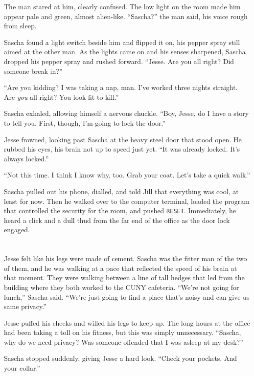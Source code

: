 \documentclass[12pt]{book}
\begin{document}
The man stared at him, clearly confused.  The low light on the room made him appear pale and green, almost alien-like.  ``Sascha?'' the man said, his voice rough from sleep.

Sascha found a light switch beside him and flipped it on, his pepper spray still aimed at the other man.  As the lights came on and his senses sharpened, Sascha dropped his pepper spray and rushed forward.  ``Jesse.  Are you all right?  Did someone break in?''

``Are you kidding?  I was taking a nap, man.  I've worked three nights straight.  Are \emph{you} all right?  You look fit to kill.''

Sascha exhaled, allowing himself a nervous chuckle.  ``Boy, Jesse, do I have a story to tell you.  First, though, I'm going to lock the door.''

Jesse frowned, looking past Sascha at the heavy steel door that stood open.  He rubbed his eyes, his brain not up to speed just yet.  ``It was already locked.  It's always locked.''

``Not this time.  I think I know why, too.  Grab your coat.  Let's take a quick walk.''

Sascha pulled out his phone, dialled, and told Jill that everything was cool, at least for now.  Then he walked over to the computer terminal, loaded the program that controlled the security for the room, and pushed \texttt{RESET}.  Immediately, he heard a click and a dull thud from the far end of the office as the door lock engaged.

\chapter{}

Jesse felt like his legs were made of cement.  Sascha was the fitter man of the two of them, and he was walking at a pace that reflected the speed of his brain at that moment.  They were walking between a line of tall hedges that led from the building where they both worked to the CUNY cafeteria.  ``We're not going for lunch,'' Sascha said.  ``We're just going to find a place that's noisy and can give us same privacy.''

Jesse puffed his cheeks and willed his legs to keep up.  The long hours at the office had been taking a toll on his fitness, but this was simply unnecessary.  ``Sascha, why do we need privacy?  Was someone offended that I was asleep at my desk?''

Sascha stopped suddenly, giving Jesse a hard look.  ``Check your pockets.  And your collar.''
\end{document}

